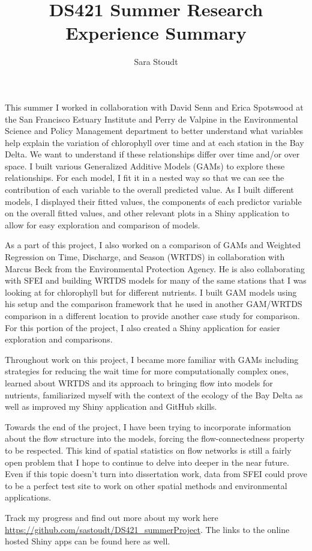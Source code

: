 \documentclass[12pt]{amsart}
\title{DS421 Summer Research Experience Summary}
\author{Sara Stoudt}
\begin{document}
\maketitle


This summer I worked in collaboration with David Senn and Erica Spotswood at the  San Francisco Estuary Institute and Perry de Valpine in the Environmental Science and Policy Management department to better understand what variables help explain the variation of chlorophyll over time and at each station in the Bay Delta. We want to understand if these relationships differ over time and/or over space. I built various Generalized Additive Models (GAMs) to explore these relationships. For each model, I fit it in a nested way so that we can see the contribution of each variable to the overall predicted value. As I built different models, I displayed their fitted values, the components of each predictor variable on the overall fitted values, and other relevant plots in a Shiny application to allow for easy exploration and comparison of models.

As a part of this project, I also worked on a comparison of GAMs and Weighted Regression on Time, Discharge, and Season (WRTDS) in collaboration with Marcus Beck from the Environmental Protection Agency. He is also collaborating with SFEI and building WRTDS models for many of the same stations that I was looking at for chlorophyll but for different nutrients. I built GAM models using his setup and the comparison framework that he used in another GAM/WRTDS comparison in a different location to provide another case study for comparison. For this portion of the project, I also created a Shiny application for easier exploration and comparisons. 

Throughout work on this project, I became more familiar with GAMs including strategies for reducing the wait time for more computationally complex ones, learned about WRTDS and its approach to bringing flow into models for nutrients,  familiarized myself with the context of the ecology of the Bay Delta as well as improved my Shiny application and GitHub skills. 

Towards the end of the project, I have been trying to incorporate information about the flow structure into the models, forcing the flow-connectedness property to be respected. This kind of spatial statistics on flow networks is still a fairly open problem that I hope to continue to delve into deeper in the near future. Even if this topic doesn't turn into dissertation work, data from SFEI could prove to be a perfect test site to work on other spatial methods and environmental applications.

Track my progress and find out more about my work here \url{https://github.com/sastoudt/DS421_summerProject}. The links to the online hosted Shiny apps can be found here as well.
\end{document}

